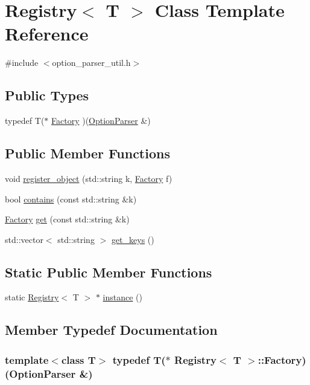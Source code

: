 \hypertarget{classRegistry}{\section{Registry$<$ T $>$ Class Template Reference}
\label{classRegistry}
}


{\ttfamily \#include $<$option\-\_\-parser\-\_\-util.\-h$>$}

\subsection*{Public Types}
\begin{DoxyCompactItemize}
\item 
typedef T($\ast$ \hyperlink{classRegistry_a29a8539fd5ce9087a7b356cec7ef528d}{Factory} )(\hyperlink{classOptionParser}{Option\-Parser} \&)
\end{DoxyCompactItemize}
\subsection*{Public Member Functions}
\begin{DoxyCompactItemize}
\item 
void \hyperlink{classRegistry_ac8743ef4f6c786cdc586c10690304b65}{register\-\_\-object} (std\-::string k, \hyperlink{classRegistry_a29a8539fd5ce9087a7b356cec7ef528d}{Factory} f)
\item 
bool \hyperlink{classRegistry_a79b86846244b816987d2393e7feb9e92}{contains} (const std\-::string \&k)
\item 
\hyperlink{classRegistry_a29a8539fd5ce9087a7b356cec7ef528d}{Factory} \hyperlink{classRegistry_a147252987619d55e30d2d81724dadcca}{get} (const std\-::string \&k)
\item 
std\-::vector$<$ std\-::string $>$ \hyperlink{classRegistry_a6f9ae594d466810bed868efda4065efb}{get\-\_\-keys} ()
\end{DoxyCompactItemize}
\subsection*{Static Public Member Functions}
\begin{DoxyCompactItemize}
\item 
static \hyperlink{classRegistry}{Registry}$<$ T $>$ $\ast$ \hyperlink{classRegistry_a6036963c4d06bfe4bee6f3f478733922}{instance} ()
\end{DoxyCompactItemize}


\subsection{Member Typedef Documentation}
\hypertarget{classRegistry_a29a8539fd5ce9087a7b356cec7ef528d}{
\subsubsection[{Factory}]{\setlength{\rightskip}{0pt plus 5cm}template$<$class T$>$ typedef T($\ast$ {\bf Registry}$<$ T $>$\-::Factory)({\bf Option\-Parser} \&)}}\label{classRegistry_a29a8539fd5ce9087a7b356cec7ef528d}


